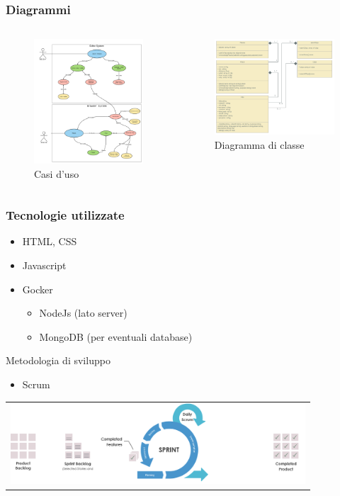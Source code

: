 \documentclass{beamer}
\begin{document}
\begin{frame}
\frametitle{Diagrammi}
\begin{columns}
	\centering 
	\begin{figure}[h]
	\includegraphics[width=5cm]{Images/UML/UML4.png}
	\vfill
	\caption{Casi d'uso}
	\end{figure}
	
	\vspace{0.8cm}
	\centering 
	\begin{figure}[h]
	\includegraphics[width=5.5cm]{Images/diagramma_di_classe2.png}
	\caption{Diagramma di classe}
	\end{figure}
\end{columns}
\end{frame}

\begin{frame}
\frametitle{Tecnologie utilizzate}
\begin{itemize}
  \item HTML, CSS
  \item Javascript
  \item Gocker
  \begin{itemize}
  \item NodeJs (lato server)
  \item MongoDB (per eventuali database)
\end{itemize}
\end{itemize}
\vspace{2mm}
Metodologia di sviluppo
  \begin{itemize}
  \item Scrum
\end{itemize}
      \centering  \begin{tabular}{c}
        \includegraphics[width=11cm]{Images/scrum/scrum-sprint}
      \end{tabular}
\end{frame}
\end{document}
